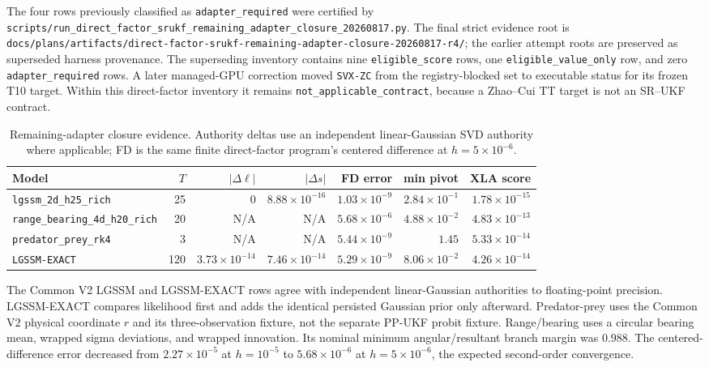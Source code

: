 \documentclass[11pt]{article}
\begin{document}
The four rows previously classified as \texttt{adapter\_required} were
certified by
\texttt{scripts/run\_direct\_factor\_srukf\_remaining\_adapter\_closure\_20260817.py}.
The final strict evidence root is
\texttt{docs/plans/artifacts/direct-factor-srukf-remaining-adapter-closure-20260817-r4/};
the earlier attempt roots are preserved as superseded harness provenance. The
superseding inventory contains nine \texttt{eligible\_score} rows, one
\texttt{eligible\_value\_only} row, and zero
\texttt{adapter\_required} rows. A later managed-GPU correction moved
\texttt{SVX-ZC} from the registry-blocked set to executable status for its
frozen T10 target. Within this direct-factor inventory it remains
\texttt{not\_applicable\_contract}, because a Zhao--Cui TT target is not an
SR--UKF contract.

\begin{table}[ht]
\centering
\caption{Remaining-adapter closure evidence. Authority deltas use an
independent linear-Gaussian SVD authority where applicable; FD is the same
finite direct-factor program's centered difference at $h=5\times10^{-6}$.}
\label{tab:remaining-adapter-closure}
\begin{tabular}{lrrrrrr}
\toprule
Model & $T$ & $|\Delta \ell|$ & $|\Delta s|$ & FD error & min pivot & XLA score \\
\midrule
\texttt{lgssm\_2d\_h25\_rich} & 25 & $0$ & $8.88\times10^{-16}$ & $1.03\times10^{-9}$ & $2.84\times10^{-1}$ & $1.78\times10^{-15}$ \\
\texttt{range\_bearing\_4d\_h20\_rich} & 20 & N/A & N/A & $5.68\times10^{-6}$ & $4.88\times10^{-2}$ & $4.83\times10^{-13}$ \\
\texttt{predator\_prey\_rk4} & 3 & N/A & N/A & $5.44\times10^{-9}$ & $1.45$ & $5.33\times10^{-14}$ \\
\texttt{LGSSM-EXACT} & 120 & $3.73\times10^{-14}$ & $7.46\times10^{-14}$ & $5.29\times10^{-9}$ & $8.06\times10^{-2}$ & $4.26\times10^{-14}$ \\
\bottomrule
\end{tabular}
\end{table}

The Common V2 LGSSM and LGSSM-EXACT rows agree with independent
linear-Gaussian authorities to floating-point precision. LGSSM-EXACT compares
likelihood first and adds the identical persisted Gaussian prior only
afterward. Predator-prey uses the Common V2 physical coordinate $r$ and its
three-observation fixture, not the separate PP-UKF probit fixture.
Range/bearing uses a circular bearing mean, wrapped sigma deviations, and
wrapped innovation. Its nominal minimum angular/resultant branch margin was
$0.988$. The centered-difference error decreased from
$2.27\times10^{-5}$ at $h=10^{-5}$ to $5.68\times10^{-6}$ at
$h=5\times10^{-6}$, the expected second-order convergence.
\end{document}
